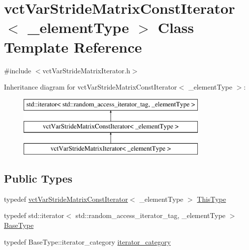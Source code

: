\hypertarget{classvct_var_stride_matrix_const_iterator}{}\section{vct\+Var\+Stride\+Matrix\+Const\+Iterator$<$ \+\_\+element\+Type $>$ Class Template Reference}
\label{classvct_var_stride_matrix_const_iterator}


{\ttfamily \#include $<$vct\+Var\+Stride\+Matrix\+Iterator.\+h$>$}

Inheritance diagram for vct\+Var\+Stride\+Matrix\+Const\+Iterator$<$ \+\_\+element\+Type $>$\+:\begin{figure}[H]
\begin{center}
\leavevmode
\includegraphics[height=3.000000cm]{d8/d1c/classvct_var_stride_matrix_const_iterator}
\end{center}
\end{figure}
\subsection*{Public Types}
\begin{DoxyCompactItemize}
\item 
typedef \hyperlink{classvct_var_stride_matrix_const_iterator}{vct\+Var\+Stride\+Matrix\+Const\+Iterator}$<$ \+\_\+element\+Type $>$ \hyperlink{classvct_var_stride_matrix_const_iterator_af68182ea2024c532e999fd1333cb0c6e}{This\+Type}
\item 
typedef std\+::iterator$<$ std\+::random\+\_\+access\+\_\+iterator\+\_\+tag, \+\_\+element\+Type $>$ \hyperlink{classvct_var_stride_matrix_const_iterator_af92f59f70debf8b2ac92e032621a9b1e}{Base\+Type}
\item 
typedef Base\+Type\+::iterator\+\_\+category \hyperlink{classvct_var_stride_matrix_const_iterator_a1620d069cfd9a2016c871fa2b5fde20a}{iterator\+\_\+category}
\end{DoxyCompactItemize}
